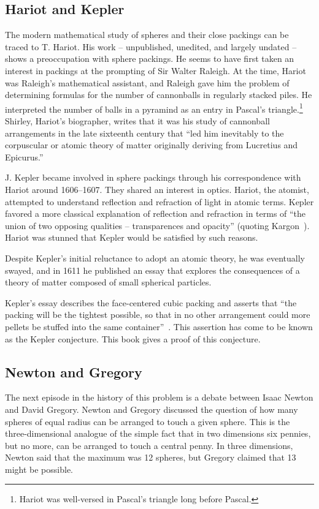 \subsection{Hariot and Kepler}

The modern mathematical study of spheres and their close packings can
be traced to T. Hariot.  His work -- unpublished, unedited, and
largely undated -- shows a preoccupation with sphere packings.  He
seems to have first taken an interest in packings at the prompting of
Sir Walter Raleigh.  At the time, Hariot was Raleigh's mathematical
assistant, and Raleigh gave him the problem of determining formulas
for the number of cannonballs in regularly stacked piles.  He
interpreted the number of balls in a pyramind as an entry in Pascal's
triangle.\footnote{Hariot was well-versed in Pascal's triangle long
  before Pascal.}  Shirley, Hariot's biographer, writes that it was
his study of cannonball arrangements in the late sixteenth century
that  ``led him inevitably to the corpuscular or atomic
theory of matter originally deriving from Lucretius and Epicurus.''
\cite[p.242]{Shi83}

J. Kepler became involved in sphere packings through his correspondence
with Hariot around 1606--1607. They shared an interest in optics.
Hariot, the atomist, attempted to understand reflection and refraction
of light in atomic terms.  Kepler favored a more classical explanation of
reflection and refraction in terms of ``the union of two opposing
qualities -- transparences and opacity'' (quoting Kargon~\cite[p.26]{Kar66}).  
Hariot was stunned that
Kepler would be satisfied by such reasons.

Despite Kepler's initial reluctance to adopt an atomic
theory, he was eventually swayed, and in 1611 he published an essay
that explores the consequences of a theory of matter composed of small
spherical particles. 

Kepler's essay describes the face-centered cubic packing and asserts
that ``the packing will be the tightest possible, so that in no other
arrangement could more pellets be stuffed into the same
container''~\cite{Kepler}.  This assertion has come to be known as the
Kepler conjecture.  This book
gives a proof of this conjecture.

\subsection{Newton and Gregory}

The next episode in the history of this problem is a debate between
Isaac Newton and David Gregory.  Newton and Gregory discussed the
question of how many spheres of equal radius can be arranged to touch
a given sphere.  This is the three-dimensional analogue of the simple
fact that in two dimensions six pennies, but no more, can be arranged
to touch a central penny.  In three dimensions, Newton said that the maximum was
12 spheres, but Gregory claimed that 13 might be possible.

